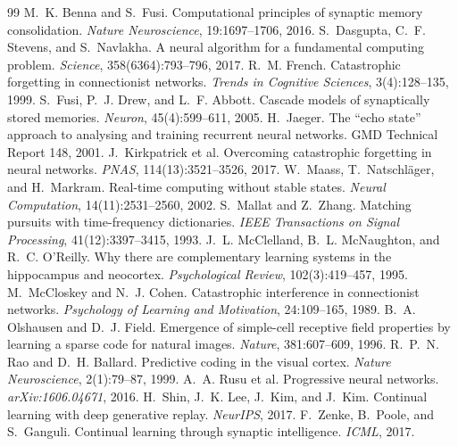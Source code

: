 \documentclass[11pt]{article}
\begin{document}
\begin{thebibliography}{99}
 M.~K. Benna and S.~Fusi. Computational principles of
synaptic memory consolidation. \emph{Nature Neuroscience}, 19:1697--1706,
2016.
 S.~Dasgupta, C.~F. Stevens, and S.~Navlakha. A
neural algorithm for a fundamental computing problem. \emph{Science},
358(6364):793--796, 2017.
 R.~M. French. Catastrophic forgetting in connectionist
networks. \emph{Trends in Cognitive Sciences}, 3(4):128--135, 1999.
 S.~Fusi, P.~J. Drew, and L.~F. Abbott. Cascade models of
synaptically stored memories. \emph{Neuron}, 45(4):599--611, 2005.
 H.~Jaeger. The ``echo state'' approach to analysing
and training recurrent neural networks. GMD Technical Report 148, 2001.
 J.~Kirkpatrick et al. Overcoming catastrophic
forgetting in neural networks. \emph{PNAS}, 114(13):3521--3526, 2017.
 W.~Maass, T.~Natschl\"ager, and H.~Markram. Real-time
computing without stable states. \emph{Neural Computation},
14(11):2531--2560, 2002.
 S.~Mallat and Z.~Zhang. Matching pursuits with
time-frequency dictionaries. \emph{IEEE Transactions on Signal Processing},
41(12):3397--3415, 1993.
 J.~L. McClelland, B.~L. McNaughton, and R.~C.
O'Reilly. Why there are complementary learning systems in the hippocampus
and neocortex. \emph{Psychological Review}, 102(3):419--457, 1995.
 M.~McCloskey and N.~J. Cohen. Catastrophic
interference in connectionist networks. \emph{Psychology of Learning and
Motivation}, 24:109--165, 1989.
 B.~A. Olshausen and D.~J. Field. Emergence of
simple-cell receptive field properties by learning a sparse code for
natural images. \emph{Nature}, 381:607--609, 1996.
 R.~P.~N. Rao and D.~H. Ballard. Predictive coding in the
visual cortex. \emph{Nature Neuroscience}, 2(1):79--87, 1999.
 A.~A. Rusu et al. Progressive neural networks.
\emph{arXiv:1606.04671}, 2016.
 H.~Shin, J.~K. Lee, J.~Kim, and J.~Kim. Continual
learning with deep generative replay. \emph{NeurIPS}, 2017.
 F.~Zenke, B.~Poole, and S.~Ganguli. Continual learning
through synaptic intelligence. \emph{ICML}, 2017.
\end{thebibliography}

\appendix
\end{document}
